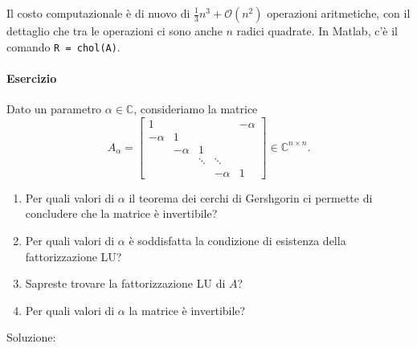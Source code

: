 \documentclass[a4paper]{report}
\theoremstyle{definiton}
\theoremstyle{remark}
\begin{document}
Il costo computazionale è di nuovo di $\frac13n^3 + \mathcal{O}(n^2)$ operazioni aritmetiche, con il dettaglio che tra le operazioni ci sono anche $n$ radici quadrate. In Matlab, c'è il comando \lstinline{R = chol(A)}.

\paragraph{Esercizio} Dato un parametro $\alpha \in \mathbb{C}$, consideriamo la matrice
\[
A_\alpha =
\begin{bmatrix}
    1  & & & & -\alpha\\
    -\alpha & 1 & & & \\
    & -\alpha & 1 & & \\
    & & \ddots & \ddots\\
    & & & -\alpha & 1
\end{bmatrix} \in \mathbb{C}^{n\times n}.
\]
\begin{enumerate}
    \item Per quali valori di $\alpha$ il teorema dei cerchi di Gershgorin ci permette di concludere che la matrice è invertibile?
    \item Per quali valori di $\alpha$ è soddisfatta la condizione di esistenza della fattorizzazione LU?
    \item Sapreste trovare la fattorizzazione LU di $A$?
    \item Per quali valori di $\alpha$ la matrice è invertibile?
\end{enumerate}
Soluzione:
\end{document}
